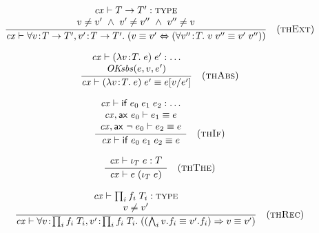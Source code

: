 
\[
\frac{\begin{array}{c}\mathit{cx}\vdash T\to T':\textsc{type}\\v\neq v'\ \wedge\ v'\neq v''\ \wedge\ v''\neq v\end{array}}{\mathit{cx}\vdash\forall v\!:\!T\to T',v'\!:\!T\to T'.\;(v\equiv v'\Leftrightarrow(\forall v''\!:\!T.\;v\;v''\equiv v'\;v''))}\quad\mbox{(\textsc{thExt})}
\]

\[
\frac{\begin{array}{c}\mathit{cx}\vdash(\lambda v\!:\!T.\;e)\;e':\ldots\\\mathit{OKsbs}(e,v,e')\end{array}}{\mathit{cx}\vdash(\lambda v\!:\!T.\;e)\;e'\equiv e[v/e']}\quad\mbox{(\textsc{thAbs})}
\]

\[
\frac{\begin{array}{c}\mathit{cx}\vdash\mathsf{if}\;e_0\;e_1\;e_2:\ldots\\\mathit{cx},\mathsf{ax}\ e_0\vdash e_1\equiv e\\\mathit{cx},\mathsf{ax}\ \neg\;e_0\vdash e_2\equiv e\end{array}}{\mathit{cx}\vdash\mathsf{if}\;e_0\;e_1\;e_2\equiv e}\quad\mbox{(\textsc{thIf})}
\]

\[
\frac{\begin{array}{c}\mathit{cx}\vdash\iota_{T}\;e:T\end{array}}{\mathit{cx}\vdash e\;(\iota_{T}\;e)}\quad\mbox{(\textsc{thThe})}
\]

\[
\frac{\begin{array}{c}\mathit{cx}\vdash\prod_{i}f_i\;T_i:\textsc{type}\\v\neq v'\end{array}}{\mathit{cx}\vdash\forall v\!:\!\prod_{i}f_i\;T_i,v'\!:\!\prod_{i}f_i\;T_i.\;((\bigwedge_{i}v.f_i\equiv v'.f_i)\Rightarrow v\equiv v')}\quad\mbox{(\textsc{thRec})}
\]




